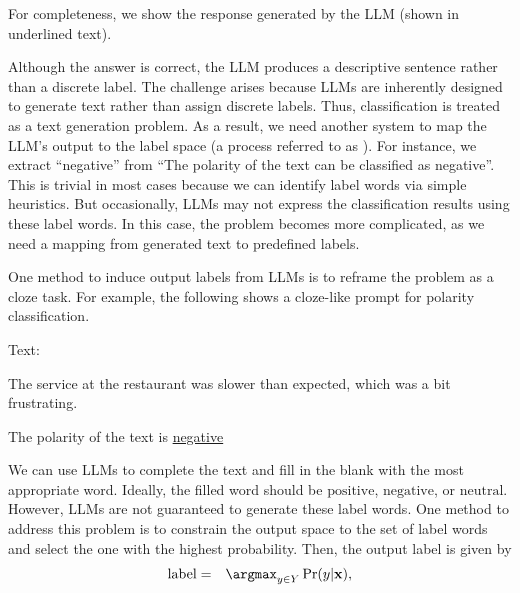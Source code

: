 \noindent For completeness, we show the response generated by the LLM (shown in underlined text).

Although the answer is correct, the LLM produces a descriptive sentence rather than a discrete label. The challenge arises because LLMs are inherently designed to generate text rather than assign discrete labels. Thus, classification is treated as a text generation problem.  As a result, we need another system to map the LLM's output to the label space (a process referred to as ). For instance, we extract ``negative'' from ``The polarity of the text can be classified as negative''. This is trivial in most cases because we can identify label words via simple heuristics. But occasionally, LLMs may not express the classification results using these label words. In this case, the problem becomes more complicated, as we need a mapping from generated text to predefined labels.

One method to induce output labels from LLMs is to reframe the problem as a cloze task. For example, the following shows a cloze-like prompt for polarity classification.

\vspace{0.5em}
\begin{tcolorbox}

\begingroup
\setlength{\leftskip}{2em}
\setlength{\rightskip}{2em}


\vspace{0.7em}

Text:

The service at the restaurant was slower than expected, which was a bit frustrating.

\vspace{0.7em}

The polarity of the text is \underline{negative}

\endgroup

\end{tcolorbox}
\vspace{0.5em}

\noindent We can use LLMs to complete the text and fill in the blank with the most appropriate word. Ideally, the filled word should be $\mathrm{positive}$, $\mathrm{negative}$, or $\mathrm{neutral}$. However, LLMs are not guaranteed to generate these label words. One method to address this problem is to constrain the output space to the set of label words and select the one with the highest probability. Then, the output label is given by
\begin{eqnarray}
\mathrm{label} & = & \argmax_{y \in Y} \Pr(y|\mathbf{x}),
\end{eqnarray}

